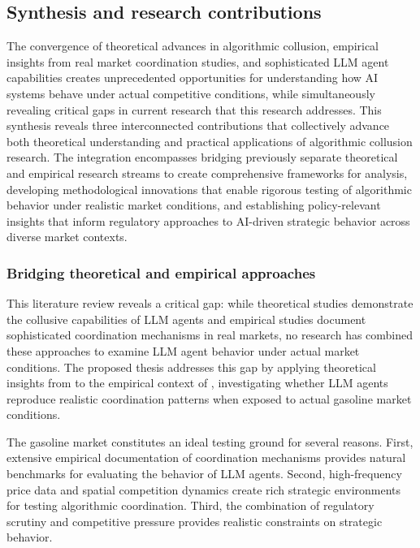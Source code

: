 \subsection{Synthesis and research contributions}

The convergence of theoretical advances in algorithmic collusion, empirical insights from real market coordination studies, and sophisticated LLM agent capabilities creates unprecedented opportunities for understanding how AI systems behave under actual competitive conditions, while simultaneously revealing critical gaps in current research that this research addresses. This synthesis reveals three interconnected contributions that collectively advance both theoretical understanding and practical applications of algorithmic collusion research. The integration encompasses bridging previously separate theoretical and empirical research streams to create comprehensive frameworks for analysis, developing methodological innovations that enable rigorous testing of algorithmic behavior under realistic market conditions, and establishing policy-relevant insights that inform regulatory approaches to AI-driven strategic behavior across diverse market contexts.

\subsubsection*{Bridging theoretical and empirical approaches}

This literature review reveals a critical gap: while theoretical studies demonstrate the collusive capabilities of LLM agents and empirical studies document sophisticated coordination mechanisms in real markets, no research has combined these approaches to examine LLM agent behavior under actual market conditions. The proposed thesis addresses this gap by applying theoretical insights from \textcite{fish_algorithmic_2025} to the empirical context of \textcite{byrne_learning_2019}, investigating whether LLM agents reproduce realistic coordination patterns when exposed to actual gasoline market conditions.

The gasoline market constitutes an ideal testing ground for several reasons. First, extensive empirical documentation of coordination mechanisms provides natural benchmarks for evaluating the behavior of LLM agents. Second, high-frequency price data and spatial competition dynamics create rich strategic environments for testing algorithmic coordination. Third, the combination of regulatory scrutiny and competitive pressure provides realistic constraints on strategic behavior.

